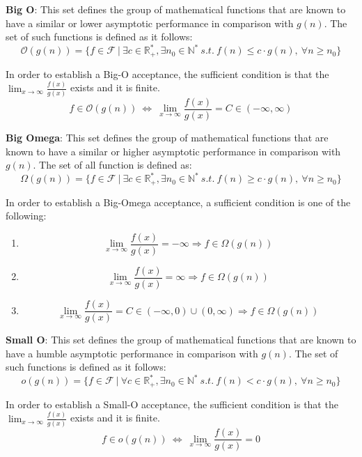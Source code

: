 \begin{definition}
    \textbf{Big O}: This set defines the group of mathematical functions that are known to have a similar or lower
    asymptotic performance in comparison with  $g(n)$. The set of such functions is defined as it follows:
    \[\mathcal{O}(g(n)) = \lbrace f \in \mathcal{F}\ |\ \exists c \in \mathbb{R}^{*}_{+}, \exists n_{0} \in \mathbb{N}^{*}\ s.t.\  f(n) \leq c \cdot g(n),\  \forall n \geq n_{0} \rbrace\]
\end{definition}
\begin{lemma}
    In order to establish a Big-O acceptance, the sufficient condition is that the $ \lim_{x\to\infty} \frac{f(x)}{g(x)}$ exists and it is finite.
    \[ f \in \mathcal{O}(g(n))\ \Leftrightarrow\ \lim_{x\to\infty} \frac{f(x)}{g(x)} = C \in (-\infty, \infty) \]
\end{lemma}


\begin{definition}
    \textbf{Big Omega}: This set defines the group of mathematical functions that are known to have a similar or higher asymptotic performance in comparison with  $g(n)$. The set of all function is defined as:
    \[\Omega(g(n)) = \lbrace f \in \mathcal{F}\ |\ \exists c \in \mathbb{R}^{*}_{+}, \exists n_{0} \in \mathbb{N}^{*}\ s.t.\  f(n) \geq c \cdot g(n),\  \forall n \geq n_{0} \rbrace\]
\end{definition}

\begin{lemma}
    In order to establish a Big-Omega acceptance, a sufficient condition is one of the following:
    \begin{enumerate}[label=(\roman*)]

        \item  \[  \lim_{x\to\infty} \frac{f(x)}{g(x)} = -\infty \Rightarrow f \in \Omega(g(n))\ \]
        \item  \[ \lim_{x\to\infty} \frac{f(x)}{g(x)} = \infty \Rightarrow f \in \Omega(g(n))\  \]
        \item  \[ \lim_{x\to\infty} \frac{f(x)}{g(x)} = C \in (-\infty, 0) \cup (0,\infty) \Rightarrow f \in \Omega(g(n))\ \]
    \end{enumerate}
\end{lemma}

\begin{definition}
    \textbf{Small O}:
    This set defines the group of mathematical functions that are known to have a humble
    asymptotic performance in comparison with  $g(n)$. The set of such functions is defined as it follows:
    \[o(g(n)) = \lbrace f \in \mathcal{F}\ |\ \forall c \in \mathbb{R}^{*}_{+}, \exists n_{0} \in \mathbb{N}^{*}\ s.t.\  f(n) < c \cdot g(n),\  \forall n \geq n_{0} \rbrace\]
\end{definition}
\begin{lemma}
    In order to establish a Small-O acceptance, the sufficient condition is that the $ \lim_{x\to\infty} \frac{f(x)}{g(x)}$ exists and it is finite.
    \[ f \in o(g(n))\ \Leftrightarrow\ \lim_{x\to\infty} \frac{f(x)}{g(x)} = 0 \]
\end{lemma}

